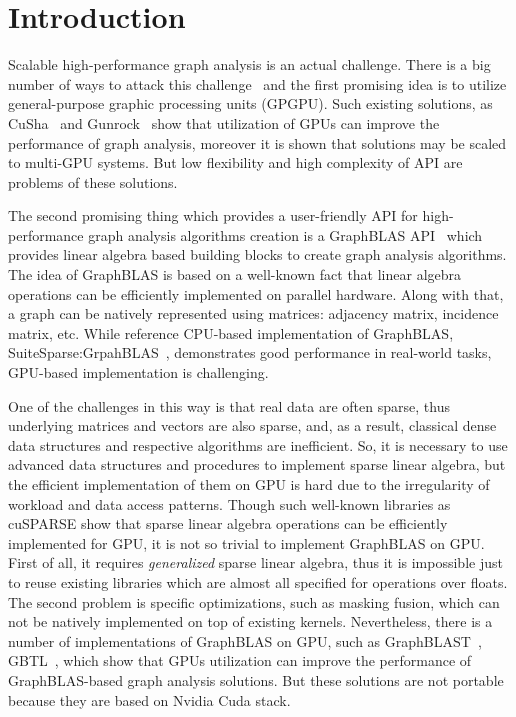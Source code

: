 \section{Introduction}

Scalable high-performance graph analysis is an actual challenge.
There is a big number of ways to attack this challenge~\cite{Coimbra2021} and the first promising idea is to utilize general-purpose graphic processing units (GPGPU).
Such existing solutions, as CuSha~\cite{10.1145/2600212.2600227} and Gunrock~\cite{7967137} show that utilization of GPUs can improve the performance of graph analysis, moreover it is shown that solutions may be scaled to multi-GPU systems.
But low flexibility and high complexity of API are problems of these solutions.

The second promising thing which provides a user-friendly API for high-performance graph analysis algorithms creation is a GraphBLAS API~\cite{7761646} which provides linear algebra based building blocks to create graph analysis algorithms.
The idea of GraphBLAS is based on a well-known fact that linear algebra operations can be efficiently implemented on parallel hardware.
Along with that, a graph can be natively represented using matrices: adjacency matrix, incidence matrix, etc.
While reference CPU-based implementation of GraphBLAS, SuiteSparse:GrpahBLAS~\cite{10.1145/3322125}, demonstrates good performance in real-world tasks, GPU-based implementation is challenging.

One of the challenges in this way is that real data are often sparse, thus underlying matrices and vectors are also sparse, and, as a result, classical dense data structures and respective algorithms are inefficient. 
So, it is necessary to use advanced data structures and procedures to implement sparse linear algebra, but the efficient implementation of them on GPU is hard due to the irregularity of workload and data access patterns.
Though such well-known libraries as cuSPARSE show that sparse linear algebra operations can be efficiently implemented for GPU, it is not so trivial to implement GraphBLAS on GPU. 
First of all, it requires \textit{generalized} sparse linear algebra, thus it is impossible just to reuse existing libraries which are almost all specified for operations over floats.
The second problem is specific optimizations, such as masking fusion, which can not be natively implemented on top of existing kernels.
Nevertheless, there is a number of implementations of GraphBLAS on GPU, such as GraphBLAST~\cite{yang2019graphblast}, GBTL~\cite{7529957}, which show that GPUs utilization can improve the performance of GraphBLAS-based graph analysis solutions.
But these solutions are not portable because they are based on Nvidia Cuda stack.

